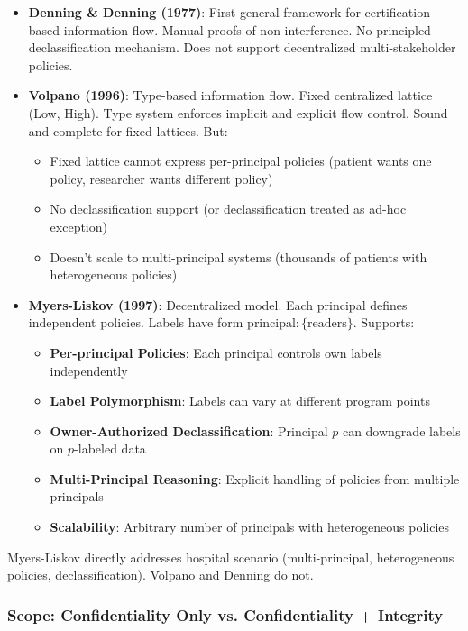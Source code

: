 \begin{itemize}
\item \textbf{Denning \& Denning (1977)}: First general framework for certification-based information flow. Manual proofs of non-interference. No principled declassification mechanism. Does not support decentralized multi-stakeholder policies.

\item \textbf{Volpano (1996)}: Type-based information flow. Fixed centralized lattice (Low, High). Type system enforces implicit and explicit flow control. Sound and complete for fixed lattices. But:
  \begin{itemize}
  \item Fixed lattice cannot express per-principal policies (patient wants one policy, researcher wants different policy)
  \item No declassification support (or declassification treated as ad-hoc exception)
  \item Doesn't scale to multi-principal systems (thousands of patients with heterogeneous policies)
  \end{itemize}

\item \textbf{Myers-Liskov (1997)}: Decentralized model. Each principal defines independent policies. Labels have form $\text{principal}: \{\text{readers}\}$. Supports:
  \begin{itemize}
  \item \textbf{Per-principal Policies}: Each principal controls own labels independently
  \item \textbf{Label Polymorphism}: Labels can vary at different program points
  \item \textbf{Owner-Authorized Declassification}: Principal $p$ can downgrade labels on $p$-labeled data
  \item \textbf{Multi-Principal Reasoning}: Explicit handling of policies from multiple principals
  \item \textbf{Scalability}: Arbitrary number of principals with heterogeneous policies
  \end{itemize}
\end{itemize}

Myers-Liskov directly addresses hospital scenario (multi-principal, heterogeneous policies, declassification). Volpano and Denning do not.

\subsubsection{Scope: Confidentiality Only vs. Confidentiality + Integrity}

